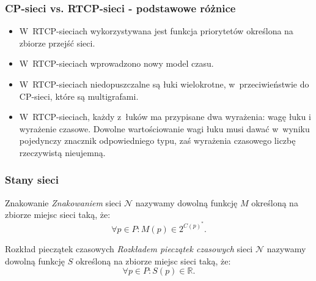 \documentclass{beamer}
\begin{document}


\begin{frame}
\frametitle{CP-sieci vs. RTCP-sieci - podstawowe różnice}

\begin{itemize}[<+-| alert@+>]  %
\setlength{\itemsep}{3mm}

\item W~RTCP-sieciach wykorzystywana jest funkcja priorytetów określona na zbiorze przejść sieci.

\item W~RTCP-sieciach wprowadzono nowy model czasu.

\item W~RTCP-sieciach niedopuszczalne są łuki wielokrotne, w~przeciwieństwie do CP-sieci, które są multigrafami.

\item W~RTCP-sieciach, każdy z~łuków ma przypisane dwa wyrażenia: wagę łuku i wyrażenie czasowe. Dowolne wartościowanie wagi łuku musi dawać w~wyniku pojedynczy znacznik odpowiedniego typu, zaś wyrażenia czasowego liczbę rzeczywistą nieujemną. 


\end{itemize}


\end{frame}




\begin{frame}
\frametitle{Stany sieci}

\begin{block}{Znakowanie}
{\em Znakowaniem} sieci $\mathcal{N}$ nazywamy dowolną funkcję $M$ określoną na zbiorze miejsc sieci taką, że:
 \begin{equation} 
\label{eq:znakowanie}
\forall p \in P \colon M(p) \in 2^{C(p)^*}.
\end{equation}
\end{block}

\pause

\begin{block}{Rozkład pieczątek czasowych}
{\em Rozkładem pieczątek czasowych} sieci $\mathcal{N}$ nazywamy dowolną funkcję $S$ określoną na zbiorze miejsc sieci taką, że: 
\begin{equation}
\label{eq:rozkladPieczatek}
\forall p \in P \colon S(p) \in \mathbb{R}.
\end{equation}
\end{block}

\end{frame}
\end{document}
